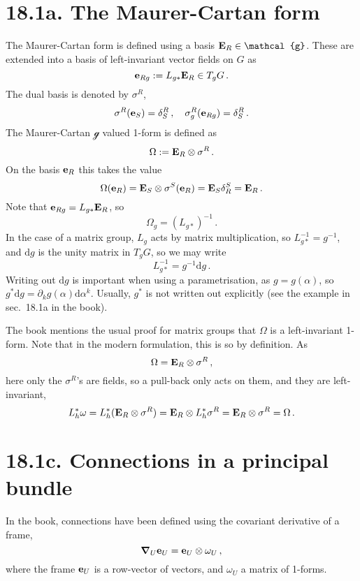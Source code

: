 \documentclass[a4paper,12pt]{article}
\def\d{\mathrm{d}}
\begin{document}
\section*{18.1a. The Maurer-Cartan form}

The Maurer-Cartan form is defined using a basis ${\bf E}_R\in\mathcal{g}$. These are extended into a basis of left-invariant vector fields on $G$ as
\[
 {\bf e}_{Rg} := L_{g*} {\bf E}_R \in T_g G\,.
\]
The dual basis is denoted by $\sigma^R$,
\[
 \sigma^R({\bf e}_S) = \delta^R_S\,,\quad \sigma^R_g({\bf e}_{Rg})=\delta^R_S\,.
\]
The Maurer-Cartan $\mathcal{g}$ valued 1-form is defined as
\[
 \Omega := {\bf E}_R \otimes \sigma^R\,.
\]
On the basis ${\bf e}_R$ this takes the value
\[
 \Omega({\bf e}_R)  = {\bf E}_S \otimes \sigma^S({\bf e}_R) = {\bf E}_S \delta^S_R = {\bf E}_R\,.
\]
Note that ${\bf e}_{Rg} = L_{g*} {\bf E}_R$, so
\[
 \Omega_g = (L_{g*})^{-1}\,.
\]
In the case of a matrix group, $L_g$ acts by matrix multiplication, so $L_{g*}^{-1} = g^{-1}$, and $\d g$ is the unity matrix in $T_g G$, so we may write
\[
 L_{g*}^{-1} = g^{-1}\d g\,.
\]
Writing out $\d g$ is important when using a parametrisation, as $g=g(\alpha)$, so $g^*\d g = \partial_k g(\alpha) \d\alpha^k$. Usually, $g^*$ is not written out explicitly (see the example in sec.\ 18.1a in the book).

The book mentions the usual proof for matrix groups that $\Omega$ is a left-invariant 1-form. Note that in the modern formulation, this is so by definition. As
\[
 \Omega = {\bf E}_R \otimes \sigma^R\,,
\]
here only the $\sigma^R$'s are fields, so a pull-back only acts on them, and they are left-invariant,
\[
 L_h^* \omega = L_h^* ({\bf E}_R\otimes \sigma^R) = {\bf E}_R \otimes L_h^* \sigma^R = {\bf E}_R \otimes \sigma^R = \Omega\,.
\]


\section*{18.1c. Connections in a principal bundle}
In the book, connections have been defined using the covariant derivative of a frame,
\[
 \boldsymbol{\nabla}_U {\bf e}_U = {\bf e}_U \otimes \omega_U\,,
\]
where the frame ${\bf e}_U$ is a row-vector of vectors, and $\omega_U$ a matrix of 1-forms.
\end{document}

